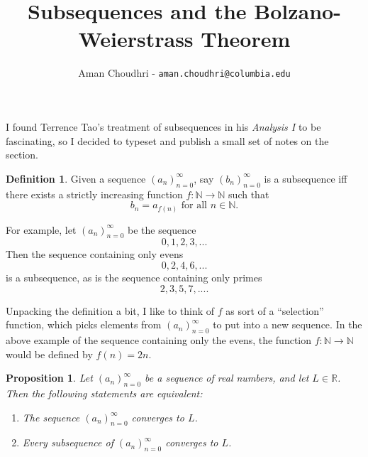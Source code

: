 \documentclass[11pt, oneside]{article}
\title{Subsequences and the Bolzano-Weierstrass Theorem}
\author{Aman Choudhri - \texttt{aman.choudhri@columbia.edu}}
\newcommand{\R}{\mathbb{R}}
\newtheorem{prop}{Proposition}
\theoremstyle{definition}
\newtheorem*{definition}{Definition}
\begin{document}
\maketitle
I found Terrence Tao's treatment of subsequences in his \emph{Analysis I} to be fascinating, so I decided to typeset and publish a small set of notes on the section.

\begin{definition}
    Given a sequence $(a_n)_{n=0}^\infty$, say $(b_n)_{n=0}^\infty$ is a subsequence iff there exists a
    strictly increasing function $f: \mathbb{N} \rightarrow \mathbb{N}$ such that
    $$b_n = a_{f(n)} \text{ \ for all $n \in \mathbb{N}$.}$$
\end{definition}

For example, let $(a_n)_{n=0}^\infty$ be the sequence
$$0, 1, 2, 3, ...$$
Then the sequence containing only evens
$$0, 2, 4, 6, ...$$
is a subsequence, as is the sequence containing only primes
$$2, 3, 5, 7, ....$$

Unpacking the definition a bit, I like to think of $f$ as sort of a ``selection'' function,
which picks elements from $(a_n)_{n=0}^\infty$ to put into a new sequence. In the above example of the sequence
containing only the evens, the function $f: \mathbb{N} \rightarrow \mathbb{N}$ would be defined by
$f(n) = 2n$.

\begin{prop}
    Let $(a_n)_{n=0}^\infty$ be a sequence of real numbers, and let $L \in \R$. Then the following statements are equivalent:
    \begin{enumerate}[label=\emph{(\alph*)}]
        \item The sequence $(a_n)_{n=0}^\infty$ converges to $L$.
        \item Every subsequence of $(a_n)_{n=0}^\infty$ converges to $L$.
    \end{enumerate}
\end{prop}
\end{document}
